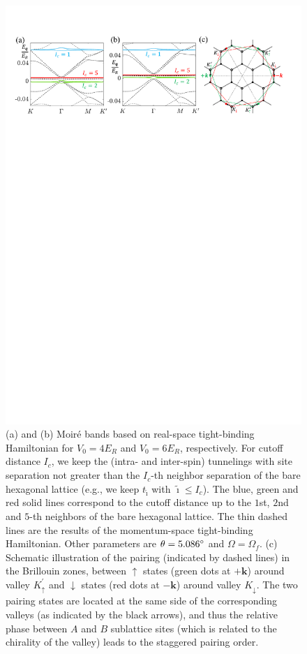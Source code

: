 \documentclass[twocolumn,english,prl,floatfix,citeautoscript,nofootinbib]{revtex4}
\begin{document}
\begin{widetext}
\begin{figure}[b]
\includegraphics[width=0.95\linewidth]{FigS_real_space_TB_r.pdf}
\caption{(a) and (b) Moir\'{e} bands based on real-space tight-binding
Hamiltonian for $V_0=4E_R$ and $V_0=6E_R$, respectively. For cutoff distance
$I_c$, we keep the (intra- and inter-spin) tunnelings with site separation
not greater than the $I_c$-th neighbor separation of the bare hexagonal
lattice (e.g., we keep $t_{\tilde{\imath}}$ with $\tilde{\imath}\leq I_c$). The blue,
green and red solid lines correspond to the cutoff distance up to the $1$st,
$2$nd and $5$-th neighbors of the bare hexagonal lattice. The thin dashed
lines are the results of the momentum-space tight-binding Hamiltonian. Other
parameters are $\protect\theta =5.086^{\circ }$ and $\Omega =\Omega_f$. (c)
Schematic illustration of the pairing (indicated by dashed lines) in the
Brillouin zones, between $\uparrow$ states (green dots at $+\mathbf{k}$)
around valley $K^{\prime }_\uparrow$ and $\downarrow$ states (red dots at $-%
\mathbf{k}$) around valley $K_\downarrow$. The two pairing states are
located at the same side of the corresponding valleys (as indicated by the
black arrows), and thus the relative phase between $A$ and $B$ sublattice
sites (which is related to the chirality of the valley) leads to the
staggered pairing order.}
\label{figS:real_space_TB}
\end{figure}


\end{widetext}
\end{document}
